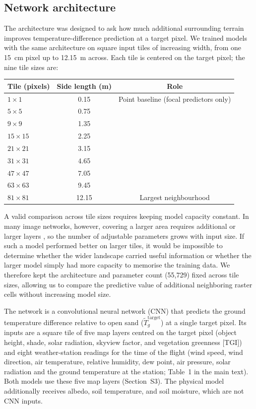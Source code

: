 \documentclass[12pt]{article}
\begin{document}
\subsection{Network architecture}

\noindent The architecture was designed to ask how much additional surrounding terrain improves temperature-difference prediction at a target pixel. We trained models with the same architecture on square input tiles of increasing width, from one 15~cm pixel up to 12.15~m across. Each tile is centered on the target pixel; the nine tile sizes are:

\begin{center}
\begin{tabular}{lcc}
\hline
Tile (pixels) & Side length (m) & Role \\
\hline
$1\times1$ & 0.15 & Point baseline (focal predictors only) \\
$5\times5$ & 0.75 & \\
$9\times9$ & 1.35 & \\
$15\times15$ & 2.25 & \\
$21\times21$ & 3.15 & \\
$31\times31$ & 4.65 & \\
$47\times47$ & 7.05 & \\
$63\times63$ & 9.45 & \\
$81\times81$ & 12.15 & Largest neighbourhood \\
\hline
\end{tabular}
\end{center}

A valid comparison across tile sizes requires keeping model capacity constant. In many image networks, however, covering a larger area requires additional or larger layers \citep{simonyan_2015}, so the number of adjustable parameters grows with input size. If such a model performed better on larger tiles, it would be impossible to determine whether the wider landscape carried useful information or whether the larger model simply had more capacity to memorise the training data. We therefore kept the architecture and parameter count (55,729) fixed across tile sizes, allowing us to compare the predictive value of additional neighboring raster cells without increasing model size.

The network is a convolutional neural network (CNN) that predicts the ground temperature difference relative to open sand ($\tilde{T}_g^{\text{target}}$) at a single target pixel. Its inputs are a square tile of five map layers centred on the target pixel (object height, shade, solar radiation, skyview factor, and vegetation greenness [TGI]) and eight weather-station readings for the time of the flight (wind speed, wind direction, air temperature, relative humidity, dew point, air pressure, solar radiation and the ground temperature at the station; Table~1 in the main text). Both models use these five map layers (Section~S3). The physical model additionally receives albedo, soil temperature, and soil moisture, which are not CNN inputs.
\end{document}

